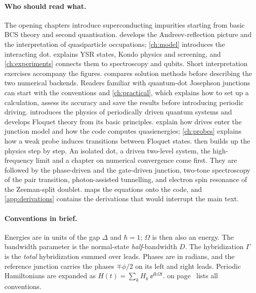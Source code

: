 \paragraph{Who should read what.}
The opening chapters introduce superconducting impurities starting from basic
BCS theory and second quantisation.  develops the
Andreev-reflection picture and the interpretation of quasiparticle occupations; \cref{ch:model} introduces the interacting
dot.  explains YSR states, Kondo physics and screening, and
\cref{ch:experiments} connects them to spectroscopy and qubits. Short interpretation
exercises accompany the figures.  compares solution methods before
describing the two numerical backends. Readers familiar with quantum-dot Josephson junctions
can start with the conventions and \cref{ch:practical}, which explains how to set up
a calculation, assess its accuracy and save the results before introducing periodic driving.
 introduces the physics of periodically driven quantum systems
and develops Floquet theory from its basic principles.
 explain how drives enter the junction model and
how the code computes quasienergies; \cref{ch:probes} explains how a weak probe induces
transitions between Floquet states.  then builds up the physics
step by step. An isolated dot, a driven two-level system, the high-frequency limit and a
chapter on numerical convergence come first. They are followed by the phase-driven and the
gate-driven junction, two-tone spectroscopy of the pair transition, photon-assisted
tunnelling, and electron spin resonance of the Zeeman-split doublet.
 maps the equations onto the code, and \cref{app:derivations} contains
the derivations that would interrupt the main text.

\paragraph{Conventions in brief.}
Energies are in units of the gap $\Delta$ and $\hbar=1$; $\Omega$ is then also an
energy. The bandwidth parameter is the normal-state \emph{half}-bandwidth $D$. The
hybridization $\Gamma$ is the \emph{total} hybridization summed over leads. Phases are in
radians, and the reference junction carries the phases $\mp\phi/2$ on its left and right
leads. Periodic Hamiltonians are expanded as $H(t)=\sum_k H_k\,\ee^{\ii k\Omega t}$.
 on page~\pageref{tab:conventions} lists all conventions.

